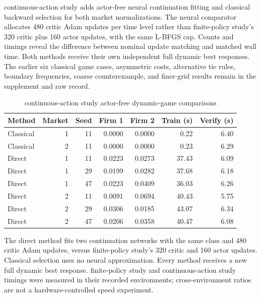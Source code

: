 continuous-action study adds actor-free neural continuation fitting and classical backward selection for both market normalizations. The neural comparator allocates 480 critic Adam updates per time level rather than finite-policy study's 320 critic plus 160 actor updates, with the same L-BFGS cap. Counts and timings reveal the difference between nominal update matching and matched wall time. Both methods receive their own independent full dynamic best responses. The earlier six classical game cases, asymmetric costs, alternative tie rules, boundary frequencies, coarse counterexample, and finer-grid results remain in the supplement and raw record.

\begin{table}[htbp]\centering
\caption{continuous-action study actor-free dynamic-game comparisons}
\begin{small}\begin{tabular}{lrrrrrr}
\toprule
Method & Market & Seed & Firm 1 & Firm 2 & Train (s) & Verify (s) \\
\midrule
Classical & 1 & 11 & 0.0000 & 0.0000 & 0.22 & 6.40 \\
Classical & 2 & 11 & 0.0000 & 0.0000 & 0.23 & 6.29 \\
Direct & 1 & 11 & 0.0223 & 0.0273 & 37.43 & 6.09 \\
Direct & 1 & 29 & 0.0199 & 0.0282 & 37.68 & 6.18 \\
Direct & 1 & 47 & 0.0223 & 0.0409 & 36.03 & 6.26 \\
Direct & 2 & 11 & 0.0091 & 0.0694 & 40.43 & 5.75 \\
Direct & 2 & 29 & 0.0306 & 0.0185 & 43.07 & 6.34 \\
Direct & 2 & 47 & 0.0206 & 0.0358 & 40.47 & 6.08 \\
\bottomrule\end{tabular}\end{small}
\par\smallskip\begin{minipage}{0.96\linewidth}\footnotesize The direct method fits two continuation networks with the same class and 480 critic Adam updates, versus finite-policy study's 320 critic and 160 actor updates. Classical selection uses no neural approximation. Every method receives a new full dynamic best response. finite-policy study and continuous-action study timings were measured in their recorded environments; cross-environment ratios are not a hardware-controlled speed experiment.\end{minipage}
\end{table}


